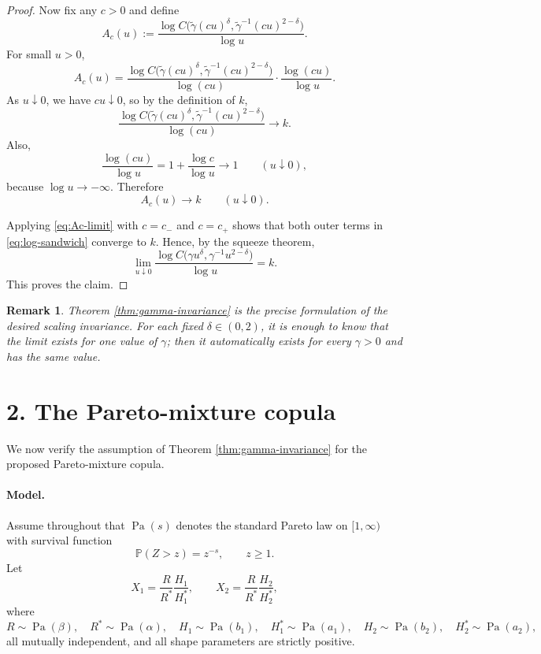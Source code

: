 \documentclass[11pt]{article}
\newtheorem{remark}[theorem]{Remark}
\DeclareMathOperator{\Pa}{Pa}
\begin{document}
\begin{proof}
Now fix any $c>0$ and define
\[
A_c(u)
:=
\frac{\log C\!\bigl(\tilde\gamma(cu)^\delta,\tilde\gamma^{-1}(cu)^{2-\delta}\bigr)}{\log u}.
\]
For small $u>0$,
\[
A_c(u)
=
\frac{\log C\!\bigl(\tilde\gamma(cu)^\delta,\tilde\gamma^{-1}(cu)^{2-\delta}\bigr)}{\log(cu)}
\cdot
\frac{\log(cu)}{\log u}.
\]
As $u\downarrow 0$, we have $cu\downarrow 0$, so by the definition of $k$,
\[
\frac{\log C\!\bigl(\tilde\gamma(cu)^\delta,\tilde\gamma^{-1}(cu)^{2-\delta}\bigr)}{\log(cu)}
\longrightarrow k.
\]
Also,
\[
\frac{\log(cu)}{\log u}
=
1+\frac{\log c}{\log u}
\longrightarrow 1
\qquad(u\downarrow 0),
\]
because $\log u\to-\infty$. Therefore
\begin{equation}\label{eq:Ac-limit}
A_c(u)\longrightarrow k
\qquad(u\downarrow 0).
\end{equation}

Applying \eqref{eq:Ac-limit} with $c=c_-$ and $c=c_+$ shows that both outer terms in \eqref{eq:log-sandwich} converge to $k$. Hence, by the squeeze theorem,
\[
\lim_{u\downarrow 0}
\frac{\log C\!\bigl(\gamma u^\delta,\gamma^{-1}u^{2-\delta}\bigr)}{\log u}
=
k.
\]
This proves the claim.
\end{proof}

\begin{remark}
Theorem \ref{thm:gamma-invariance} is the precise formulation of the desired scaling invariance. For each fixed $\delta\in(0,2)$, it is enough to know that the limit exists for one value of $\gamma$; then it automatically exists for every $\gamma>0$ and has the same value.
\end{remark}

\section*{2. The Pareto-mixture copula}

We now verify the assumption of Theorem \ref{thm:gamma-invariance} for the proposed Pareto-mixture copula.

\paragraph{Model.}
Assume throughout that $\Pa(s)$ denotes the standard Pareto law on $[1,\infty)$ with survival function
\[
\mathbb P(Z>z)=z^{-s},\qquad z\ge 1.
\]
Let
\[
X_1=\frac{R}{R^*}\frac{H_1}{H_1^*},
\qquad
X_2=\frac{R}{R^*}\frac{H_2}{H_2^*},
\]
where
\[
R\sim\Pa(\beta),\quad R^*\sim\Pa(\alpha),\quad
H_1\sim\Pa(b_1),\quad H_1^*\sim\Pa(a_1),\quad
H_2\sim\Pa(b_2),\quad H_2^*\sim\Pa(a_2),
\]
all mutually independent, and all shape parameters are strictly positive.
\end{document}
